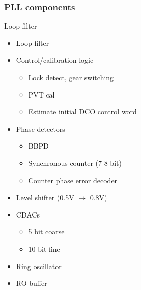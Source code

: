 \documentclass[t, screen, aspectratio=43]{beamer}
\begin{document}


\begin{frame}
	\frametitle{PLL components}
	\begin{block}{Loop filter}
		\begin{minipage}{6cm}
			\vspace{1em}
			\tiny

			\begin{itemize}[itemsep=4pt,label=\protect---]
				\item {\color{red}Loop filter}
				\item {\color{red}Control/calibration logic}
				\begin{itemize}[itemsep=4pt,label=$\bullet$]
					\item {\color{red}Lock detect, gear switching}
					\item {\color{red}PVT cal}
					\item {\color{red}Estimate initial DCO control word}
				\end{itemize}
				\item {\color{red}Phase detectors}
				\begin{itemize}[itemsep=4pt,label=$\bullet$]
					\item {\color{blue}BBPD}
					\item {\color{red}Synchronous counter (7-8 bit)}
					\item {\color{red}Counter phase error decoder}
				\end{itemize}
				\item {\color{red}Level shifter (0.5V $\rightarrow$ 0.8V)}
				\item {\color{blue}CDACs}
				\begin{itemize}[itemsep=4pt,label=$\bullet$]
					\item {\color{blue}5 bit coarse}
					\item {\color{blue}10 bit fine}
				\end{itemize}
				\item {\color{blue}Ring oscillator}
				\item {\color{blue}RO buffer}
			\end{itemize}


\end{minipage}
\end{block}
\end{frame}
\end{document}
